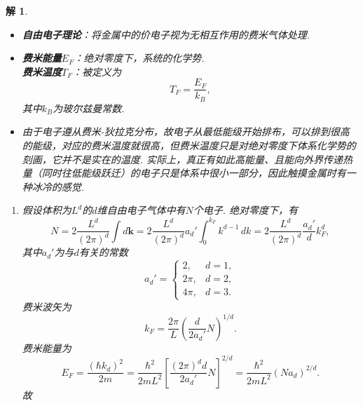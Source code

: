 \documentclass[UTF8,10pt,a4paper]{article}
\theoremstyle{Problem}
\theoremstyle{Solution}
\newtheorem*{sol}{解}
\begin{document}
\begin{sol}
    \begin{itemize}
        \item[$\triangleright$] \textbf{自由电子理论}：将金属中的价电子视为无相互作用的费米气体处理.
        \item[$\triangleright$] \textbf{费米能量$E_F$}：绝对零度下，系统的化学势.\\
        \textbf{费米温度$T_F$}：被定义为
        \begin{equation}
            T_F=\frac{E_F}{k_B},
        \end{equation}
        其中$k_B$为玻尔兹曼常数.
        \item[$\triangleright$] 由于电子遵从费米-狄拉克分布，故电子从最低能级开始排布，可以排到很高的能级，对应的费米温度就很高，但费米温度只是对绝对零度下体系化学势的刻画，它并不是实在的温度. 实际上，真正有如此高能量、且能向外界传递热量（同时往低能级跃迁）的电子只是体系中很小一部分，因此触摸金属时有一种冰冷的感觉.
    \end{itemize}
    \begin{enumerate}
        \item[(a)] 假设体积为$L^d$的$d$维自由电子气体中有$N$个电子. 绝对零度下，有
        \begin{equation}
            N=2\frac{L^d}{(2\pi)^d}\int d\bm{k}=2\frac{L^d}{(2\pi)^d}a_d'\int_0^{k_F}k^{d-1}\,dk=2\frac{L^d}{(2\pi)^d}\frac{a_d'}{d}k_F^d,
        \end{equation}
        其中$a_d'$为与$d$有关的常数
        \begin{equation}
            a_d'=\left\{\begin{array}{ll}
                2,&d=1,\\
                2\pi,&d=2,\\
                4\pi,&d=3.
            \end{array}\right.
        \end{equation}
        费米波矢为
        \begin{equation}
            \label{4-kF}
            k_F=\frac{2\pi}{L}\left(\frac{d}{2a_d'}N\right)^{1/d}.
        \end{equation}
        费米能量为
        \begin{equation}
            E_F=\frac{(\hbar k_d)^2}{2m}=\frac{\hbar^2}{2mL^2}\left[\frac{(2\pi)^dd}{2a_d'}N\right]^{2/d}=\frac{\hbar^2}{2mL^2}(Na_d)^{2/d}.
        \end{equation}
        故
        \begin{equation}

\end{equation}
\end{enumerate}
\end{sol}
\end{document}
